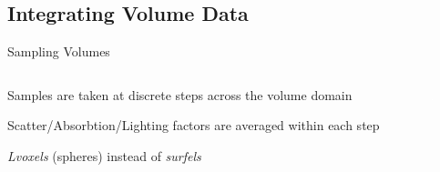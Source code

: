 \documentclass[10pt,compress,professionalfont]{beamer}
\begin{document}
\subsection{Integrating Volume Data}
\begin{frame}{Sampling Volumes}

    \begin{columns}
        \begin{column}{0.5\textwidth}

    Samples are taken at discrete steps across the volume domain\\
    \vspace{8mm}

    Scatter/Absorbtion/Lighting factors are averaged within each step\\
    \vspace{8mm}

    \textit{Lvoxels} (spheres) instead of \textit{surfels}

        \end{column}
        \begin{column}{0.5\textwidth}
            \includegraphics[width=\textwidth]{../img/diag/vol_step.pdf}\\
            \vspace{-4mm}
        \end{column}
    \end{columns}

\end{frame}
\end{document}

